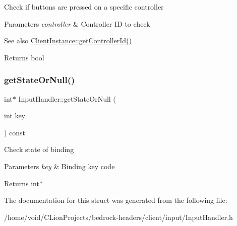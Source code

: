 Check if buttons are pressed on a specific controller 
\begin{DoxyParams}{Parameters}
{\em controller} & Controller ID to check \\
\hline
\end{DoxyParams}
\begin{DoxySeeAlso}{See also}
\mbox{\hyperlink{struct_client_instance_a80878816c82f930b5845ab48a0a3b7a8}{Client\+Instance\+::get\+Controller\+Id()}} 
\end{DoxySeeAlso}
\begin{DoxyReturn}{Returns}
bool 
\end{DoxyReturn}
\mbox{\label{struct_input_handler_ac6ce21361da184ee3d3a5b47768d1243}} 
\subsubsection{\texorpdfstring{getStateOrNull()}{getStateOrNull()}}
{\footnotesize\ttfamily int$\ast$ Input\+Handler\+::get\+State\+Or\+Null (\begin{DoxyParamCaption}\item[{int}]{key }\end{DoxyParamCaption}) const}

Check state of binding 
\begin{DoxyParams}{Parameters}
{\em key} & Binding key code \\
\hline
\end{DoxyParams}
\begin{DoxyReturn}{Returns}
int$\ast$ 
\end{DoxyReturn}


The documentation for this struct was generated from the following file\+:\begin{DoxyCompactItemize}
\item 
/home/void/\+C\+Lion\+Projects/bedrock-\/headers/client/input/Input\+Handler.\+h\end{DoxyCompactItemize}
